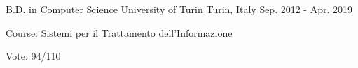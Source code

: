 


\begin{cventries}


\cventry
{B.D. in Computer Science} %
{University of Turin} %
{Turin, Italy} %
{Sep. 2012 - Apr. 2019} %
{ %
	\begin{cvitems}
		\item {Course: Sistemi per il Trattamento dell'Informazione}
		\item {Vote: 94/110}
	\end{cvitems}
}


\end{cventries}

\bigbreak